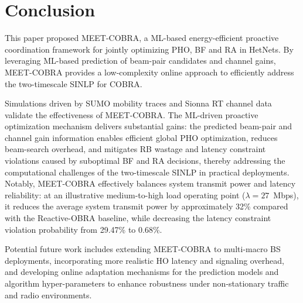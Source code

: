 \documentclass[conference, a4paper]{IEEEtran}
\theoremstyle{remark}
\begin{document}
\section{Conclusion}

This paper proposed MEET-COBRA, a ML-based energy-efficient proactive coordination framework for jointly optimizing PHO, BF and RA in HetNets.
By leveraging ML-based prediction of beam-pair candidates and channel gains, MEET-COBRA provides a low-complexity online approach to efficiently address the two-timescale SINLP for COBRA.

Simulations driven by SUMO mobility traces and Sionna RT channel data validate the effectiveness of MEET-COBRA.
The ML-driven proactive optimization mechanism delivers substantial gains: the predicted beam-pair and channel gain information enables efficient global PHO optimization, reduces beam-search overhead, and mitigates RB wastage and latency constraint violations caused by suboptimal BF and RA decisions, thereby addressing the computational challenges of the two-timescale SINLP in practical deployments. 
Notably, MEET-COBRA effectively balances system transmit power and latency reliability: at an illustrative medium-to-high load operating point ($\lambda=27$~Mbps), it reduces the average system transmit power by approximately 32\% compared with the Reactive-OBRA baseline, while decreasing the latency constraint violation probability from 29.47\% to 0.68\%. 

Potential future work includes extending MEET-COBRA to multi-macro BS deployments, incorporating more realistic HO latency and signaling overhead, and developing online adaptation mechanisms for the prediction models and algorithm hyper-parameters to enhance robustness under non-stationary traffic and radio environments.




\end{document}

